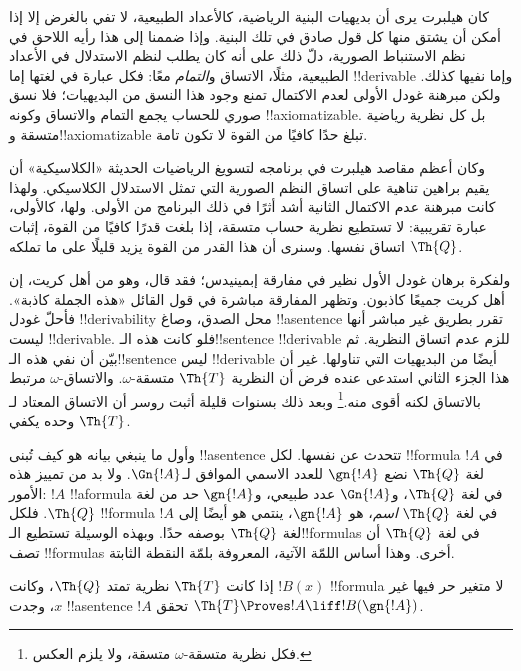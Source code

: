 \documentclass[../../../include/open-logic-section]{subfiles}
\begin{document}


كان هيلبرت يرى أن بديهيات البنية الرياضية، كالأعداد الطبيعية، لا
تفي بالغرض إلا إذا أمكن أن يشتق منها كل قول صادق في تلك البنية.
وإذا ضممنا إلى هذا رأيه اللاحق في نظم الاستنباط الصورية، دلّ ذلك
على أنه كان يطلب لنظم الاستدلال في الأعداد الطبيعية، مثلًا، الاتساق
و\emph{التمام} معًا: فكل عبارة في لغتها إما !!{derivable} وإما
نفيها كذلك. ولكن مبرهنة غودل الأولى لعدم الاكتمال تمنع وجود هذا
النسق من البديهيات؛ فلا نسق صوري للحساب يجمع التمام والاتساق وكونه
!!{axiomatizable}. بل كل نظرية رياضية متسقة و!!{axiomatizable}
تبلغ حدًا كافيًا من القوة لا تكون تامة.

وكان أعظم مقاصد هيلبرت في برنامجه لتسويغ الرياضيات الحديثة
«الكلاسيكية» أن يقيم براهين تناهية على اتساق النظم الصورية التي
تمثل الاستدلال الكلاسيكي. ولهذا كانت مبرهنة عدم الاكتمال الثانية
أشد أثرًا في ذلك البرنامج من الأولى. ولها، كالأولى، عبارة تقريبية:
لا تستطيع نظرية حساب متسقة، إذا بلغت قدرًا كافيًا من القوة، إثبات
اتساق نفسها. وسنرى أن هذا القدر من القوة يزيد قليلًا على
ما تملكه $\Th{Q}$.

ولفكرة برهان غودل الأول نظير في مفارقة إبمينيدس؛ فقد قال، وهو
من أهل كريت، إن أهل كريت جميعًا كاذبون. وتظهر المفارقة مباشرة في
قول القائل «هذه الجملة كاذبة». فأحلّ غودل !!{derivability} محل
الصدق، وصاغ !!a{sentence} تقرر بطريق غير مباشر أنها ليست
!!{derivable}. فلو كانت هذه الـ!!{sentence} !!{derivable} للزم
عدم اتساق النظرية. ثم بيّن أن نفي هذه الـ!!{sentence} ليس
!!{derivable} أيضًا من البديهيات التي تناولها. غير أن هذا الجزء
الثاني استدعى عنده فرض أن النظرية $\Th{T}$ متسقة-$\omega$.
والاتساق-$\omega$ مرتبط بالاتساق لكنه أقوى منه.\footnote{فكل نظرية
متسقة-$\omega$ متسقة، ولا يلزم العكس.} وبعد ذلك بسنوات قليلة أثبت
روسر أن الاتساق المعتاد لـ$\Th{T}$ وحده يكفي.

وأول ما ينبغي بيانه هو كيف تُبنى !!a{sentence} تتحدث عن نفسها.
لكل !!{formula} $!A$ في لغة $\Th{Q}$ نضع $\gn{!A}$ للعدد الاسمي
الموافق لـ$\Gn{!A}$. ولا بد من تمييز هذه الأمور: $!A$
!!a{formula} في لغة $\Th{Q}$، و$\Gn{!A}$ عدد طبيعي،
و$\gn{!A}$ \emph{حد} من لغة $\Th{Q}$. فلكل !!{formula} $!A$
في لغة $\Th{Q}$ \emph{اسم}، هو $\gn{!A}$، ينتمي هو أيضًا إلى
لغة $\Th{Q}$ بوصفه حدًا. وبهذه الوسيلة تستطيع الـ!!{formula}s
في لغة $\Th{Q}$ أن تصف !!{formula}s أخرى. وهذا أساس اللمّة
الآتية، المعروفة بلمّة النقطة الثابتة.

\begin{lem}
إذا كانت $\Th{T}$ نظرية تمتد $\Th{Q}$، وكانت $!B(x)$
!!{formula} لا متغير حر فيها غير $x$، وجدت !!a{sentence} $!A$
تحقق $\Th{T}\Proves !A\liff !B(\gn{!A})$.
\end{lem}
\end{document}
